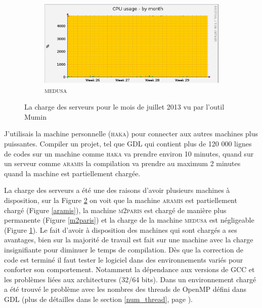 \begin{figure}
        \begin{subfigure}[b]{0.5\textwidth}
                \centering
                \includegraphics[width=\textwidth]{./images/medusa-cpu-monthm.png}
                \caption{\textsc{\large medusa}}
                \label{medusa}
        \end{subfigure}
        \caption{La charge des serveurs pour le mois de juillet 2013 vu par l'outil Mumin}\label{charge_serveurs}
        \label{charge}
\end{figure}
\newpage
J'utilisais la machine personnelle (\textsc{\large haka}) pour connecter aux autres machines plus puissantes.
Compiler un projet, tel que GDL qui contient plus de 120 000 lignes de codes sur un machine comme \textsc{\large haka} va prendre environ 10 minutes, quand sur un serveur comme \textsc{\large aramis} la compilation va prendre au maximum 2 minutes quand la machine est partiellement chargée.

La charge des serveurs a été une des raisons d'avoir plusieurs machines à disposition, sur la Figure \ref{charge} on voit que la machine \textsc{\large aramis} est partiellement chargé (Figure \ref{aramis}), la machine \textsc{\large m2paris} est chargé de manière plus permanente (Figure \ref{m2paris}) et la charge de la machine \textsc{\large medusa} est négligeable (Figure \ref{medusa}). Le fait d'avoir à disposition des machines qui sont chargés a ses avantages, bien sur la majorité de travail est fait sur une machine avec la charge insignifiante pour diminuer le temps de compilation. Dès que la correction de code est terminé il faut tester le logiciel dans des environnements variés pour conforter son comportement. Notamment la dépendance aux versions de GCC et les problèmes liées aux architectures (32/64 bits). Dans un environnement chargé a été trouvé le problème avec les nombres des threads de OpenMP défini dans GDL (plus de détailles dans le section \ref{num_thread}, page \pageref{num_thread}). 


